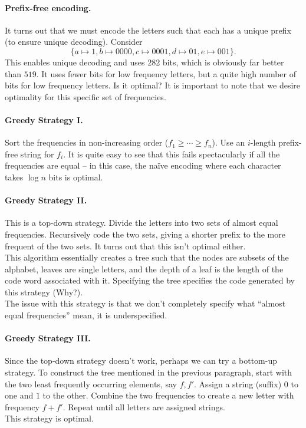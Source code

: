 \paragraph{Prefix-free encoding.} It turns out that we must encode the letters such that each has a unique prefix (to ensure unique decoding). Consider
\[ \{a\mapsto 1, b\mapsto 0000, c\mapsto 0001, d\mapsto 01, e\mapsto 001\}. \]
This enables unique decoding and uses $282$ bits, which is obviously far better than $519$. It uses fewer bits for low frequency letters, but a quite high number of bits for low frequency letters. Is it optimal? It is important to note that we desire optimality for this specific set of frequencies.

\paragraph{Greedy Strategy I.} Sort the frequencies in non-increasing order ($f_1\geq\cdots\geq f_n$). Use an $i$-length prefix-free string for $f_i$. It is quite easy to see that this fails spectacularly if all the frequencies are equal -- in this case, the na\"ive  encoding where each character takes $\log n$ bits is optimal.

\paragraph{Greedy Strategy II.} This is a top-down strategy. Divide the letters into two sets of almost equal frequencies. Recursively code the two sets, giving a shorter prefix to the more frequent of the two sets. It turns out that this isn't optimal either.\\ %
This algorithm essentially creates a tree such that the nodes are subsets of the alphabet, leaves are single letters, and the depth of a leaf is the length of the code word associated with it. Specifying the tree specifies the code generated by this strategy (Why?).\\
The issue with this strategy is that we don't completely specify what ``almost equal frequencies'' mean, it is underspecified.

\paragraph{Greedy Strategy III.} Since the top-down strategy doesn't work, perhaps we can try a bottom-up strategy. To construct the tree mentioned in the previous paragraph, start with the two least frequently occurring elements, say $f,f'$. Assign a string (suffix) $0$ to one and $1$ to the other. Combine the two frequencies to create a new letter with frequency $f+f'$. Repeat until all letters are assigned strings.\\
This strategy is optimal.


